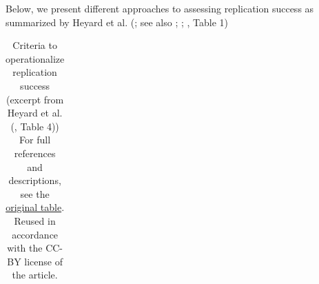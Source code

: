 \documentclass[
  letterpaper,
  DIV=11,
  openany,
  fontsize=12pt,
  parskip=half,
  headings=big,
  numbers=noenddot,
  titlepage=false]{scrreprt}
\begin{document}
Below, we present different approaches to assessing replication success
as summarized by Heyard et al. (; see
also ;
;
, Table
1)

\begin{longtable}[]{@{}
  >{\raggedright\arraybackslash}p{}
  >{\raggedright\arraybackslash}p{}
  >{\raggedright\arraybackslash}p{}@{}}

\caption{\label{tbl-rep-success-criteria}Criteria to operationalize
replication success (excerpt from Heyard et al.
(, Table 4)) For full references and
descriptions, see the
\href{http://rachelheyard.com/reproducibility_metrics/\#table}{original
table}. Reused in accordance with the CC-BY license of the article.}

\tabularnewline


\end{longtable}
\end{document}
